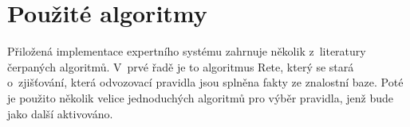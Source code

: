 \section{Použité algoritmy}
Přiložená implementace expertního systému zahrnuje několik z~literatury
čerpaných algoritmů. V~prvé řadě je to algoritmus Rete, který se stará
o~zjišťování, která odvozovací pravidla jsou splněna fakty ze znalostní
baze. Poté je použito několik velice jednoduchých algoritmů pro výběr
pravidla, jenž bude jako další aktivováno. 
